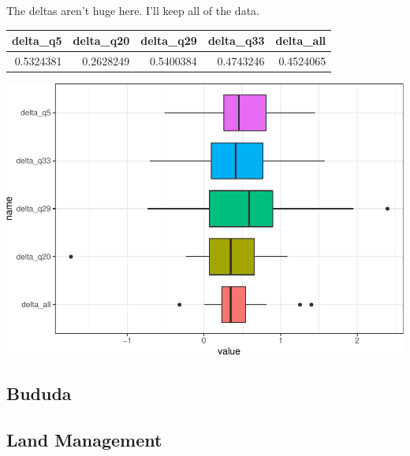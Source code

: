 \documentclass[12pt,]{article}
\begin{document}
The deltas aren't huge here. I'll keep all of the data.

\begin{longtable}[]{@{}rrrrr@{}}
\toprule
delta\_q5 & delta\_q20 & delta\_q29 & delta\_q33 &
delta\_all\tabularnewline
\midrule
\endhead
0.5324381 & 0.2628249 & 0.5400384 & 0.4743246 & 0.4524065\tabularnewline
\bottomrule
\end{longtable}

\includegraphics{preanalysis_files/figure-latex/unnamed-chunk-12-1.pdf}

\hypertarget{bududa}{%
\subsection{Bududa}\label{bududa}}

\hypertarget{land-management}{%
\subsection{Land Management}\label{land-management}}
\end{document}
